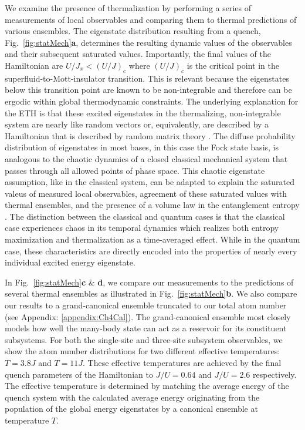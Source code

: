 We examine the presence of thermalization by performing a series of measurements of local observables and comparing them to thermal predictions of various ensembles. The eigenstate distribution resulting from a quench, Fig.~\ref{fig:statMech}\textbf{a}, determines the resulting dynamic values of the observables and their subsequent saturated values. Importantly, the final values of the Hamiltonian are $U/J_x < (U/J)_c$ where $(U/J)_c$ is the critical point in the superfluid-to-Mott-insulator transition. This is relevant because the eigenstates below this transition point are known to be non-integrable and therefore can be ergodic within global thermodynamic constraints. The underlying explanation for the ETH is that these excited eigenstates in the thermalizing, non-integrable system are nearly like random vectors or, equivalently, are described by a Hamiltonian that is described by random matrix theory \cite{Deutsch1991,DAlessio2016}. The diffuse probability distribution of eigenstates in most bases, in this case the Fock state basis, is analogous to the chaotic dynamics of a closed classical mechanical system that passes through all allowed points of phase space. This chaotic eigenstate assumption, like in the classical system, can be adapted to explain the saturated valeus of measured local observables, agreement of these saturated values with thermal ensembles, and the presence of a volume law in the entanglement entropy \cite{Deutsch1991,DAlessio2016, Page1993, Hyungwon2014Th}. The distinction between the classical and quantum cases is that the classical case experiences chaos in its temporal dynamics which realizes both entropy maximization and thermalization as a time-averaged effect. While in the quantum case, these characteristics are directly encoded into the properties of nearly every individual excited energy eigenstate.

In Fig.~\ref{fig:statMech}\textbf{c} \& \textbf{d}, we compare our measurements to the predictions of several thermal ensembles as illustrated in Fig.~\ref{fig:statMech}\textbf{b}. We also compare our results to a grand-canonical ensemble truncated to our total atom number (see Appendix: \ref{appendix:Ch4Cal}). The grand-canonical ensemble most closely models how well the many-body state can act as a reservoir for its constituent subsystems. For both the single-site and three-site subsystem observables, we show the atom number distributions for two different effective temperatures: $T=3.8J$ and $T=11J$. These effective temperatures are achieved by the final quench parameters of the Hamiltonian to $J/U=0.64$ and $J/U=2.6$ respectively. The effective temperature is determined by matching the average energy of the quench system with the calculated average energy originating from the population of the global energy eigenstates by a canonical ensemble at temperature $T$.

